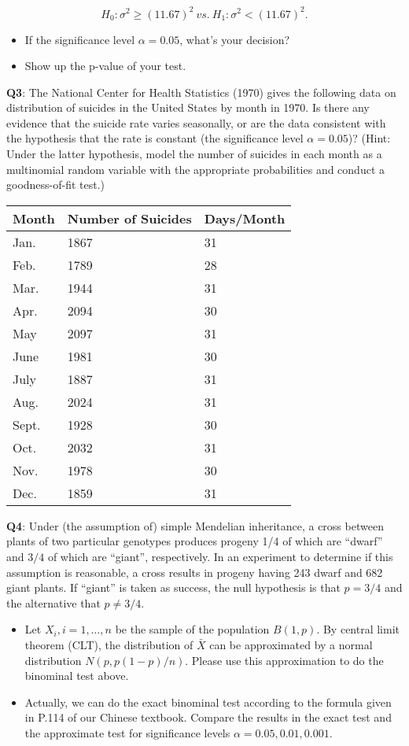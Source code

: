 \documentclass[]{article}
\begin{document}
\[H_0: \sigma^2\ge(11.67)^2\ vs.\ H_1:\sigma^2<(11.67)^2.\]

\begin{itemize}
\item
  If the significance level \(\alpha=0.05\), what's your decision?
\item
  Show up the p-value of your test.
\end{itemize}

\textbf{Q3}: The National Center for Health Statistics (1970) gives the
following data on distribution of suicides in the United States by month
in 1970. Is there any evidence that the suicide rate varies seasonally,
or are the data consistent with the hypothesis that the rate is constant
(the significance level \(\alpha=0.05\))? (Hint: Under the latter
hypothesis, model the number of suicides in each month as a multinomial
random variable with the appropriate probabilities and conduct a
goodness-of-fit test.)

\begin{longtable}[]{@{}lll@{}}
\toprule
Month & Number of Suicides & Days/Month\tabularnewline
\midrule
\endhead
Jan. & 1867 & 31\tabularnewline
Feb. & 1789 & 28\tabularnewline
Mar. & 1944 & 31\tabularnewline
Apr. & 2094 & 30\tabularnewline
May & 2097 & 31\tabularnewline
June & 1981 & 30\tabularnewline
July & 1887 & 31\tabularnewline
Aug. & 2024 & 31\tabularnewline
Sept. & 1928 & 30\tabularnewline
Oct. & 2032 & 31\tabularnewline
Nov. & 1978 & 30\tabularnewline
Dec. & 1859 & 31\tabularnewline
\bottomrule
\end{longtable}

\textbf{Q4}: Under (the assumption of) simple Mendelian inheritance, a
cross between plants of two particular genotypes produces progeny 1/4 of
which are ``dwarf'' and \(3/4\) of which are ``giant'', respectively. In
an experiment to determine if this assumption is reasonable, a cross
results in progeny having 243 dwarf and 682 giant plants. If ``giant''
is taken as success, the null hypothesis is that \(p =3/4\) and the
alternative that \(p \neq 3/4\).

\begin{itemize}
\item
  Let \(X_i,i=1,\dots,n\) be the sample of the population \(B(1,p)\). By
  central limit theorem (CLT), the distribution of \(\bar X\) can be
  approximated by a normal distribution \(N(p,p(1-p)/n)\). Please use
  this approximation to do the binominal test above.
\item
  Actually, we can do the exact binominal test according to the formula
  given in P.114 of our Chinese textbook. Compare the results in the
  exact test and the approximate test for significance levels
  \(\alpha=0.05,0.01,0.001\).
\end{itemize}
\end{document}
